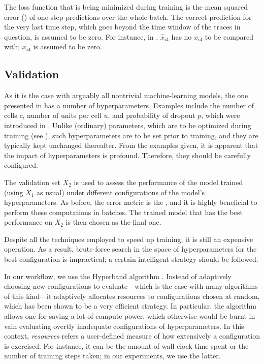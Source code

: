 The loss function that is being minimized during training is the mean squared
error () \cite{hastie2009} of one-step predictions over the whole batch.
The correct prediction for the very last time step, which goes beyond the time
window of the traces in question, is assumed to be zero. For instance, in
, $\hat{x}_{i4}$ has no $x_{i4}$ to be compared with; $x_{i4}$ is
assumed to be zero.

\subsection{Validation} 
As it is the case with arguably all nontrivial machine-learning models, the one
presented in  has a number of hyperparameters. Examples include the
number of cells $c$, number of units per cell $u$, and probability of dropout
$p$, which were introduced in . Unlike (ordinary) parameters,
which are to be optimized during training (see ), such
hyperparameters are to be set prior to training, and they are typically kept
unchanged thereafter. From the examples given, it is apparent that the impact of
hyperparameters is profound. Therefore, they should be carefully configured.

The validation set $X_2$ is used to assess the performance of the model trained
(using $X_1$ as usual) under different configurations of the model's
hyperparameters. As before, the error metric is the , and it is highly
beneficial to perform these computations in batches. The trained model that has
the best performance on $X_2$ is then chosen as the final one.

Despite all the techniques employed to speed up training, it is still an
expensive operation. As a result, brute-force search in the space of
hyperparameters for the best configuration is impractical; a certain intelligent
strategy should be followed.

In our workflow, we use the Hyperband algorithm \cite{li2016}. Instead of
adaptively choosing new configurations to evaluate---which is the case with many
algorithms of this kind---it adaptively allocates resources to configurations
chosen at random, which has been shown to be a very efficient strategy. In
particular, the algorithm allows one for saving a lot of compute power, which
otherwise would be burnt in vain evaluating overtly inadequate configurations of
hyperparameters. In this context, \emph{resources} refers a user-defined measure
of how extensively a configuration is exercised. For instance, it can be the
amount of wall-clock time spent or the number of training steps taken; in our
experiments, we use the latter.

